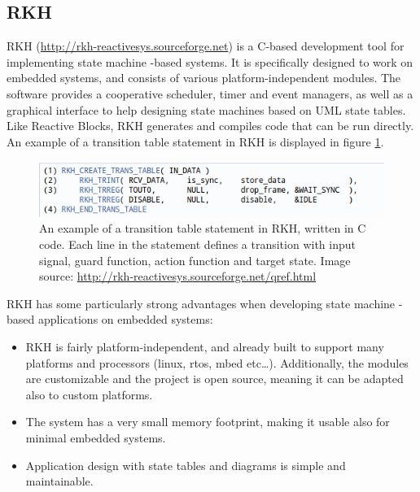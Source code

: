\subsection{RKH}
\label{sec:rkh_state_machine}
RKH (\url{http://rkh-reactivesys.sourceforge.net}) is a C-based development tool for implementing state machine -based systems. It is specifically designed to work on embedded systems, and consists of various platform-independent modules. The software provides a cooperative scheduler, timer and event managers, as well as a graphical interface to help designing state machines based on UML state tables. Like Reactive Blocks, RKH generates and compiles code that can be run directly. An example of a transition table statement in RKH is displayed in figure \ref{figure:rkh_transition}.

\begin{figure}[h]
	\centering
	\includegraphics[scale=0.7]{img/rkh_transition_table.png}
	\caption[A transition table statement in RKH]{An example of a transition table statement in RKH, written in C code. Each line in the statement defines a transition with input signal, guard function, action function and target state. Image source: \url{http://rkh-reactivesys.sourceforge.net/qref.html} \label{figure:rkh_transition} }
\end{figure}

RKH has some particularly strong advantages when developing state machine -based applications on embedded systems:
\begin{itemize}
\item RKH is fairly platform-independent, and already built to support many platforms and processors (linux, \gls{rtos}, mbed etc…). Additionally, the modules are customizable and the project is open source, meaning it can be adapted also to custom platforms.
\item The system has a very small memory footprint, making it usable also for minimal embedded systems.
\item Application design with state tables and diagrams is simple and maintainable.
\end{itemize}

